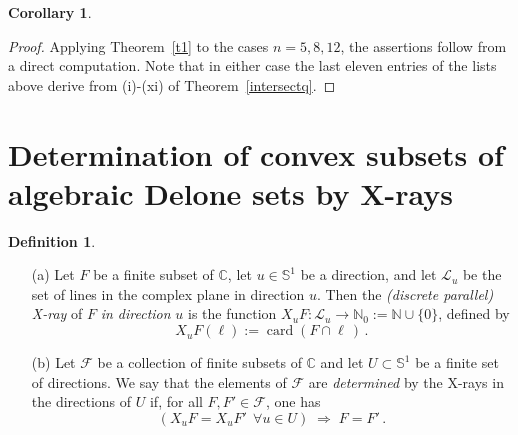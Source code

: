 \documentclass[a4paper]{amsart}
\newtheorem{coro}[theorem]{Corollary}
\theoremstyle{definition}
\newtheorem{defi}[theorem]{Definition}
\numberwithin{equation}{section}
\numberwithin{theorem}{section}
\begin{document}
\begin{coro}
\end{coro}
\begin{proof}
Applying Theorem~\ref{t1} to the cases $n=5,8,12$, the assertions
follow from a direct computation. Note that in either case the last eleven
entries of the lists above derive from (i)-(xi) of Theorem~\ref{intersectq}. 
\end{proof}

\section{Determination of convex subsets of algebraic Delone
  sets by X-rays}

\begin{defi}\label{xray..}
\begin{itemize}
\item[(a)]
Let $F$ be a finite subset of ${\mathbb{C}}$, let $u\in
\mathbb{S}^{1}$ be a direction, and let $\mathcal{L}_{u}$ be the set
of lines in the complex plane in direction $u$. Then the {\em
  (discrete parallel)}\/ {\em X-ray} of $F$ {\em in direction} $u$ is
the function $X_{u}F: \mathcal{L}_{u} \rightarrow
\mathbb{N}_{0}:=\mathbb{N} \cup\{0\}$, defined by $$X_{u}F(\ell) :=
\operatorname{card}(F \cap \ell\,)\,.$$
\item[(b)]
Let $\mathcal{F}$ be a collection of finite subsets of
${\mathbb{C}}$ and let $U\subset\mathbb{S}^{1}$ be a finite set
of directions. We say that the elements
of $\mathcal{F}$ are {\em determined} by the X-rays in the directions of $U$ if, for all $F,F' \in \mathcal{F}$, one has
$$
(X_{u}F=X_{u}F'\;\,\forall u \in U) \;  \Rightarrow\; F=F'\,.
$$
\end{itemize}
\end{defi}
\end{document}

